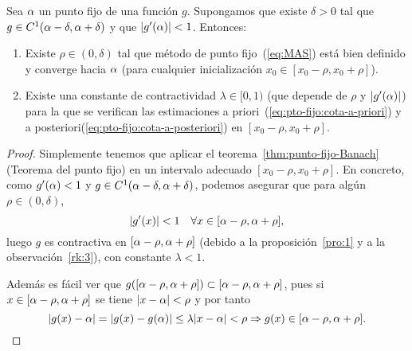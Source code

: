 \begin{theorem}
  \label{thm:punto-fijo-convergencia-local}
  Sea $\alpha$ un punto fijo de una función $g$. Supongamos que existe
  $\delta>0$ tal que $g\in C^1(\alpha-\delta,\alpha+\delta)$ y que
  $|g'(\alpha)|<1$. Entonces:
  \begin{enumerate}
  \item Existe $\rho\in (0,\delta)$ tal que método de punto
    fijo~(\ref{eq:MAS}) está bien definido y converge hacia $\alpha$
    (para cualquier inicialización $x_0 \in [x_0-\rho,x_0+\rho]$).
  \item Existe una constante de contractividad $\lambda\in [0,1)$ (que
    depende de $\rho$ y $|g'(\alpha)|$) para la que se verifican las
    estimaciones a priori~(\ref{eq:pto-fijo:cota-a-priori}) y a
    posteriori(\ref{eq:pto-fijo:cota-a-posteriori}) en
    $[x_0-\rho,x_0+\rho]$.
  \end{enumerate}
\end{theorem}
\begin{proof}
  Simplemente tenemos que aplicar el
  teorema~\ref{thm:punto-fijo-Banach} (Teorema del punto fijo) en un
  intervalo adecuado $[x_0-\rho,x_0+\rho]$. En concreto, como
  $g'(\alpha)<1$ y $g \in C^1(\alpha-\delta,\alpha+\delta)$, podemos
  asegurar que para algún $\rho\in(0,\delta)$,
  $$
  |g'(x)|<1 \quad \forall x\in [\alpha-\rho, \alpha+\rho],
  $$
  luego $g$ es contractiva en $[\alpha-\rho, \alpha+\rho]$ (debido a
  la proposición~\ref{pro:1} y a la observación~\ref{rk:3}), con
  constante $\lambda<1$.

  Además es fácil ver que $g([\alpha-\rho, \alpha+\rho]) \subset
  [\alpha-\rho, \alpha+\rho]$, pues si $x\in[\alpha-\rho, \alpha+\rho]$
  se tiene $ |x-\alpha|<\rho$ y por tanto
  $$
  |g(x)-\alpha| = |g(x)-g(\alpha)| \le \lambda |x-\alpha|< \rho
  \Rightarrow g(x)\in [\alpha-\rho, \alpha+\rho].
  $$
\end{proof}

